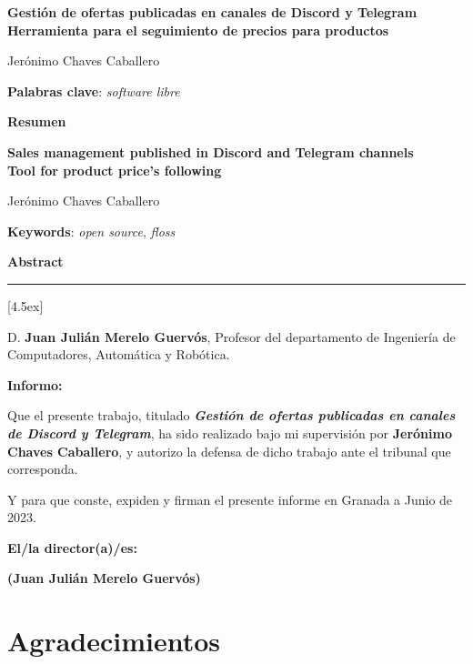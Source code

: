 \thispagestyle{empty}

\begin{center}
{\large\bfseries Gestión de ofertas publicadas en canales de Discord y Telegram \\ Herramienta para el seguimiento de precios para productos }\\
\end{center}
\begin{center}
Jerónimo Chaves Caballero\\
\end{center}


\vspace{0.5cm}
\noindent\textbf{Palabras clave}: \textit{software libre}
\vspace{0.7cm}

\noindent\textbf{Resumen}
	

\cleardoublepage

\begin{center}
	{\large\bfseries Sales management published in Discord and Telegram channels \\ Tool for product price's following}\\
\end{center}
\begin{center}
	Jerónimo Chaves Caballero\\
\end{center}
\vspace{0.5cm}
\noindent\textbf{Keywords}: \textit{open source}, \textit{floss}
\vspace{0.7cm}

\noindent\textbf{Abstract}


\cleardoublepage

\thispagestyle{empty}

\noindent\rule[-1ex]{\textwidth}{2pt}[4.5ex]

D. \textbf{Juan Julián Merelo Guervós}, Profesor del  departamento de Ingeniería de Computadores, Automática y Robótica.

\vspace{0.5cm}

\textbf{Informo:}

\vspace{0.5cm}

Que el presente trabajo, titulado \textit{\textbf{Gestión de ofertas publicadas en canales de Discord y Telegram}},
ha sido realizado bajo mi supervisión por \textbf{Jerónimo Chaves Caballero}, y autorizo la defensa de dicho trabajo ante el tribunal
que corresponda.

\vspace{0.5cm}

Y para que conste, expiden y firman el presente informe en Granada a Junio de 2023.

\vspace{1cm}

\textbf{El/la director(a)/es: }

\vspace{5cm}

\noindent \textbf{(Juan Julián Merelo Guervós)}

\chapter*{Agradecimientos}





